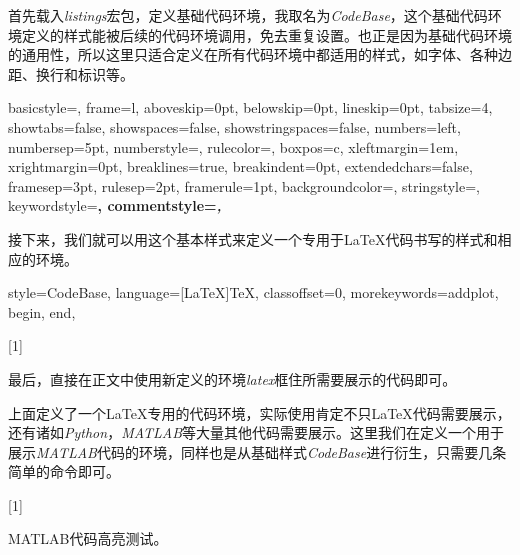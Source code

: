 首先载入\emph{listings}宏包，定义基础代码环境，我取名为\emph{CodeBase}，这个基础代码环境定义的样式能被后续的代码环境调用，免去重复设置。也正是因为基础代码环境的通用性，所以这里只适合定义在所有代码环境中都适用的样式，如字体、各种边距、换行和标识等。

\begin{latex}
{
    basicstyle=\small\ttfamily,
    frame=l,
    aboveskip=0pt,%
    belowskip=0pt,%
    lineskip=0pt,
    tabsize=4,%
    showtabs=false,%
    showspaces=false,%
    showstringspaces=false,
    numbers=left,
    numbersep=5pt,%
    numberstyle=\small\ttfamily,
    rulecolor=\color{cyan},
    boxpos=c,
    xleftmargin=1em,%
    xrightmargin=0pt,
    breaklines=true,%
    breakindent=0pt,%
    extendedchars=false,%
    framesep=3pt,
    rulesep=2pt,
    framerule=1pt,
    backgroundcolor=\color{gray!5},
    stringstyle=\color{green!40!black!100},
    keywordstyle=\bfseries\color[RGB]{0,0,255},
    commentstyle=\slshape\color{black!60},
}
\end{latex}

接下来，我们就可以用这个基本样式来定义一个专用于\LaTeX 代码书写的样式和相应的环境。

\begin{latex}
{
    style=CodeBase,
    language=[LaTeX]TeX,
    classoffset=0,
    morekeywords={addplot, begin, end},
}

[1]{\lstset{style=LaTeX}}{}
\end{latex}

最后，直接在正文中使用新定义的环境\emph{latex}框住所需要展示的代码即可。

上面定义了一个\LaTeX 专用的代码环境，实际使用肯定不只\LaTeX 代码需要展示，还有诸如\emph{Python}，\emph{MATLAB}等大量其他代码需要展示。这里我们在定义一个用于展示\emph{MATLAB}代码的环境，同样也是从基础样式\emph{CodeBase}进行衍生，只需要几条简单的命令即可。

\begin{latex}

[1]{\lstset{style=Matlab}}{}
\end{latex}

MATLAB代码高亮测试。

